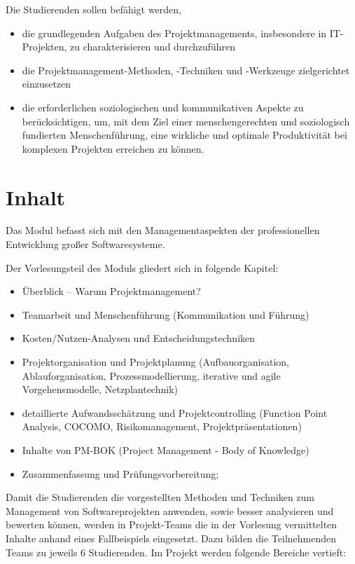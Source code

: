 Die Studierenden sollen befähigt werden,

\begin{itemize}
\tightlist
\item
  die grundlegenden Aufgaben des Projektmanagements, insbesondere in
  IT-Projekten, zu charakterisieren und durchzuführen
\item
  die Projektmanagement-Methoden, -Techniken und -Werkzeuge
  zielgerichtet einzusetzen
\item
  die erforderlichen soziologischen und kommunikativen Aspekte zu
  berücksichtigen, um, mit dem Ziel einer menschengerechten und
  soziologisch fundierten Menschenführung, eine wirkliche und optimale
  Produktivität bei komplexen Projekten erreichen zu können.
\end{itemize}

\hypertarget{inhaltpathlabelmi-2017modulbeschreibungen-bachelorba_projektmanagement}{%
\section*{Inhalt\label{/mi-2017/modulbeschreibungen-bachelor/BA_Projektmanagement}}\label{inhaltpathlabelmi-2017modulbeschreibungen-bachelorba_projektmanagement}}

Das Modul befasst sich mit den Managementaspekten der professionellen
Entwicklung großer Softwaresysteme.

Der Vorlesungsteil des Moduls gliedert sich in folgende Kapitel:

\begin{itemize}
\tightlist
\item
  Überblick -- Warum Projektmanagement?
\item
  Teamarbeit und Menschenführung (Kommunikation und Führung)
\item
  Kosten/Nutzen-Analysen und Entscheidungstechniken
\item
  Projektorganisation und Projektplanung (Aufbauorganisation,
  Ablauforganisation, Prozessmodellierung, iterative und agile
  Vorgehensmodelle, Netzplantechnik)
\item
  detaillierte Aufwandsschätzung und Projektcontrolling (Function Point
  Analysis, COCOMO, Risikomanagement, Projektpräsentationen)
\item
  Inhalte von PM-BOK (Project Management - Body of Knowledge)
\item
  Zusammenfassung und Prüfungsvorbereitung;
\end{itemize}

Damit die Studierenden die vorgestellten Methoden und Techniken zum
Management von Softwareprojekten anwenden, sowie besser analysieren und
bewerten können, werden in Projekt-Teams die in der Vorlesung
vermittelten Inhalte anhand eines Fallbeispiels eingesetzt. Dazu bilden
die Teilnehmenden Teams zu jeweils 6 Studierenden. Im Projekt werden
folgende Bereiche vertieft:


